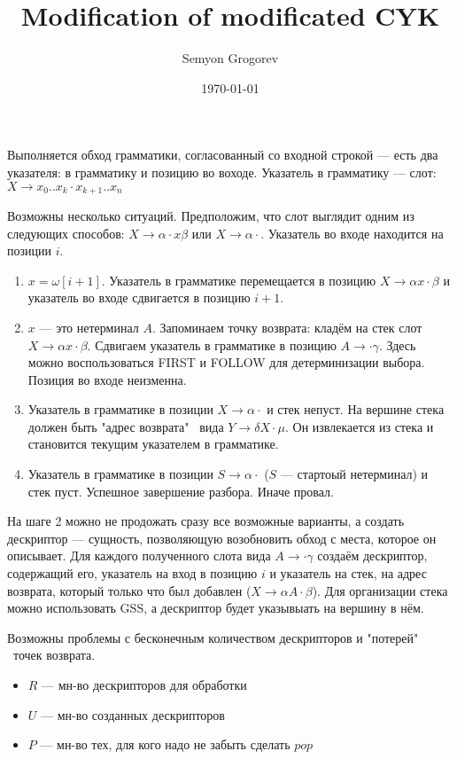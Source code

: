 \documentclass[12pt]{article}  %
\title{Modification of modificated CYK}
\author{Semyon Grogorev}
\date{\today}
\theoremstyle{definition}
\theoremstyle{remark}
\begin{document}
Выполняется обход грамматики, согласованный со входной строкой --- есть два указателя: в грамматику и позицию во воходе.
Указатель в грамматику --- слот: $X \rightarrow x_0 .. x_k \cdot x_{k+1} .. x_n$

Возможны несколько ситуаций. Предположим, что слот выглядит одним из следующих способов: $X \rightarrow \alpha \cdot x \beta$ или $X \rightarrow \alpha \cdot$. Указатель во входе находится на позиции $i$.
\begin{enumerate}
\item $x = \omega[i+1]$. Указатель в грамматике перемещается в позицию $X \rightarrow \alpha x \cdot \beta$ и указатель во входе сдвигается в позицию $i+1$.
\item $x$ --- это нетерминал $A$. Запоминаем точку возврата: кладём на стек слот $X \rightarrow \alpha x \cdot \beta$. Сдвигаем указатель в грамматике в позицию $A \rightarrow \cdot \gamma$. Здесь можно воспользоваться FIRST и FOLLOW для детерминизации выбора. 
      Позиция во входе неизменна.
\item Указатель в грамматике в позиции $X \rightarrow \alpha \cdot$ и стек непуст. На вершине стека должен быть "адрес возврата" \  вида $Y \rightarrow \delta X \cdot \mu$. 
      Он извлекается из стека и становится текущим указателем в грамматике. 
\item Указатель в грамматике в позиции $S \rightarrow \alpha \cdot$ ($S$ --- стартоый нетерминал) и стек пуст. Успешное завершение разбора. Иначе провал. 
\end{enumerate}

На шаге 2 можно не продожать сразу все возможные варианты, а создать дескриптор --- сущность, позволяющую возобновить обход с места, которое он описывает.
Для каждого полученного слота вида $A \rightarrow \cdot \gamma$ создаём дескриптор, содержащий его, указатель на вход в позицию $i$ и указатель на стек, на адрес возврата, который только что был добавлен ($X \rightarrow \alpha A \cdot \beta$).
Для организации стека можно использовать GSS, а дескриптор будет указывыать на вершину в нём.

Возможны проблемы с бесконечным количеством дескрипторов и "потерей" \ точек возврата.

\begin{itemize}
\item $R$ --- мн-во дескрипторов для обработки
\item $U$ --- мн-во созданных дескрипторов
\item $P$ --- мн-во тех, для кого надо не забыть сделать $pop$
\end{itemize}
\end{document}

